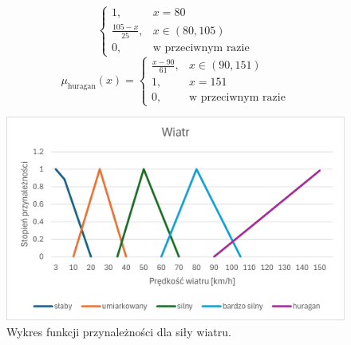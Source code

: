 \documentclass{article}
\begin{document}
\begin{enumerate}
\begin{equation}
\begin{cases}
                    1, & x = 80 \\
                    \frac{105 - x}{25}, & x \in (80, 105) \\
                    0, & \text{w przeciwnym razie}
                    \end{cases}
              \end{equation}
                 \begin{equation}
                    \mu_{\text{huragan}}(x) =
                    \begin{cases}
                    \frac{x - 90}{61}, & x \in (90, 151) \\
                    1, & x = 151 \\
                    0, & \text{w przeciwnym razie}
                    \end{cases}
              \end{equation}
        \begin{figure}[H]
    \centering
    \includegraphics[width=\textwidth]{img/wind.png}
    \caption{Wykres funkcji przynależności dla siły wiatru.}
    \end{figure}
              

\end{enumerate}
\end{document}
